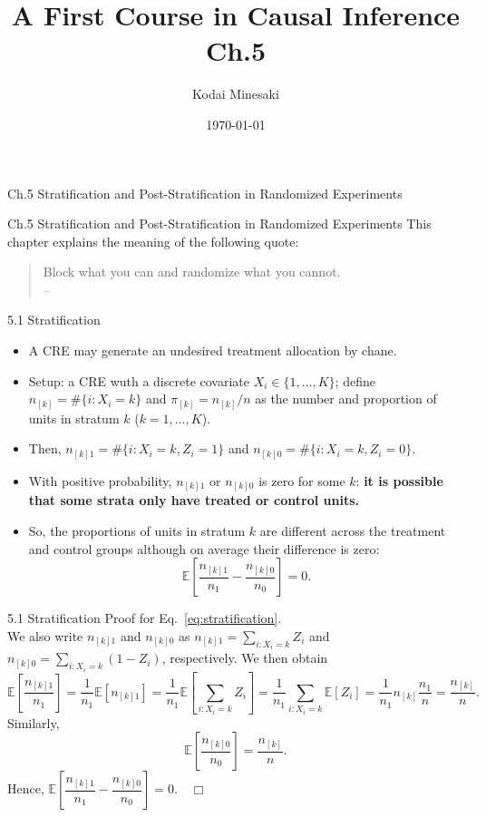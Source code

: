 \documentclass[aspectratio=169, 12pt]{beamer}
\title[]{A First Course in Causal Inference Ch.5}
\author[Kodai Minesaki]{Kodai Minesaki}
\institute[Faculty of Engineering, The University of Tokyo]{Faculty of Engineering, The University of Tokyo}
\date{\today}
\begin{document}
\begin{frame}
\titlepage
\end{frame}


\begin{frame}

  {
    \large
    Ch.5 Stratification and Post-Stratification in Randomized Experiments
  }
  
\end{frame}

\begin{frame}{Ch.5 Stratification and Post-Stratification in Randomized Experiments}
  This chapter explains the meaning of the following quote:
  \begin{quotation}
    Block what you can and randomize what you cannot. \\
    -- \ \citet{box1978statistics}
  \end{quotation}
\end{frame}

\begin{frame}{5.1 Stratification}
  \begin{itemize}
    \item A CRE may generate an undesired treatment allocation by chane. 
    \item Setup: a CRE wuth a discrete covariate $X_i\in \{1,\dots,K\}$; define $n_{[k]}=\# \{i:X_i=k\}$ and $\pi_{[k]}=n_{[k]}/n$ as the number and proportion of units in stratum $k$ ($k=1,\dots,K$).
    \item Then, $n_{[k]1}=\#\{i:X_i=k,Z_i=1\}$ and $n_{[k]0}=\#\{i:X_i=k,Z_i=0\}$.
    \item With positive probability, $n_{[k]1}$ or $n_{[k]0}$ is zero for some $k$: \textbf{it is possible that some strata only have treated or control units.}
    \item So, the proportions of units in stratum $k$ are different across the treatment and control groups although on average their difference is zero:
    \begin{equation}
      \mathbb{E}\left[\frac{n_{[k]1}}{n_1}-\frac{n_{[k]0}}{n_0}\right]=0.
      \label{eq:stratification}
    \end{equation}
   \end{itemize}
\end{frame}

\begin{frame}{5.1 Stratification}
  Proof for Eq.~\eqref{eq:stratification}. \\
  We also write $n_{[k]1}$ and $n_{[k]0}$ as $n_{[k]1}=\sum_{i:X_i=k}^{}Z_i$ and $n_{[k]0}=\sum_{i:X_i=k}^{}(1-Z_i)$, respectively. We then obtain
  \[
  \mathbb{E}\left[\frac{n_{[k]1}}{n_1}\right]=\frac{1}{n_1}\mathbb{E}[n_{[k]1}] = \frac{1}{n_1}\mathbb{E}\left[\sum_{i:X_i=k}^{}Z_i\right]=\frac{1}{n_1}\sum_{i:X_i=k}^{}\mathbb{E}[Z_i] = \frac{1}{n_1}n_{[k]}\frac{n_1}{n} = \frac{n_{[k]}}{n}.
  \]
  Similarly, 
  \[
  \mathbb{E}\left[\frac{n_{[k]0}}{n_0}\right] = \frac{n_{[k]}}{n}.
  \]
  Hence, $\mathbb{E}\left[\dfrac{n_{[k]1}}{n_1}-\dfrac{n_{[k]0}}{n_0}\right]=0. \quad \Box$
  
\end{frame}
\end{document}
